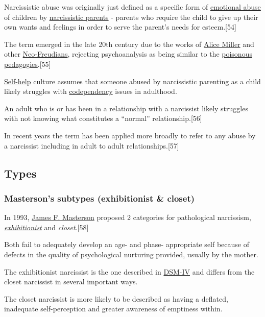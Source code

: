 \documentclass[oneside]{book}
\numberwithin{equation}{section}
\begin{document}
Narcissistic abuse was originally just defined as a specific form of \href{https://en.wikipedia.org/wiki/Emotional_abuse}{emotional abuse} of children by \href{https://en.wikipedia.org/wiki/Narcissistic_parents}{narcissistic parents} - parents who require the child to give up their own wants and feelings in order to serve the parent's needs for esteem.[54]

The term emerged in the late 20th century due to the works of \href{https://en.wikipedia.org/wiki/Alice_Miller_(psychologist)}{Alice Miller} and other \href{https://en.wikipedia.org/wiki/Neo-Freudian}{Neo-Freudians}, rejecting psychoanalysis as being similar to the \href{https://en.wikipedia.org/wiki/Poisonous_pedagogy}{poisonous pedagogies}.[55]

%
\href{https://en.wikipedia.org/wiki/Self-help}{Self-help} culture assumes that someone abused by narcissistic parenting as a child likely struggles with \href{https://en.wikipedia.org/wiki/Codependency}{codependency} issues in adulthood.

An adult who is or has been in a relationship with a narcissist likely struggles with not knowing what constitutes a ``normal'' relationship.[56]

%
In recent years the term has been applied more broadly to refer to any abuse by a narcissist including in adult to adult relationships.[57] 

\subsection{Types}

\subsubsection{Masterson's subtypes (exhibitionist \& closet)}
In 1993, \href{https://en.wikipedia.org/wiki/James_F._Masterson}{James F. Masterson} proposed 2 categories for pathological narcissism, \href{https://en.wikipedia.org/wiki/Exhibitionist}{\textit{exhibitionist}} and \textit{closet}.[58]

Both fail to adequately develop an age- and phase- appropriate self because of defects in the quality of psychological nurturing provided, usually by the mother.

The exhibitionist narcissist is the one described in \href{https://en.wikipedia.org/wiki/DSM-IV}{DSM-IV} and differs from the closet narcissist in several important ways.

The closet narcissist is more likely to be described as having a deflated, inadequate self-perception and greater awareness of emptiness within.
\end{document}
